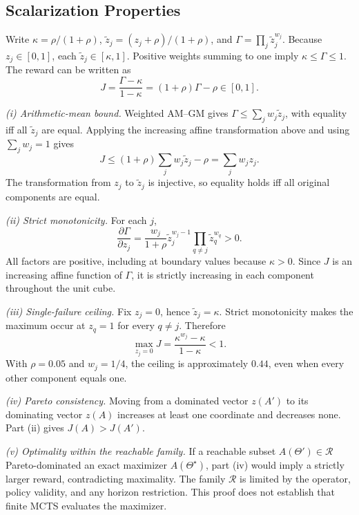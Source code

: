 \documentclass[conference]{IEEEtran}
\begin{document}
\subsection{Scalarization Properties}
\begin{IEEEproof}
Write $\kappa=\rho/(1+\rho)$, $\tilde z_j=(z_j+\rho)/(1+\rho)$, and $\Gamma=\prod_j\tilde z_j^{w_j}$. Because $z_j\in[0,1]$, each $\tilde z_j\in[\kappa,1]$. Positive weights summing to one imply $\kappa\le\Gamma\le1$. The reward can be written as
\[
J=\frac{\Gamma-\kappa}{1-\kappa}=(1+\rho)\Gamma-\rho\in[0,1].
\]

\textit{(i) Arithmetic-mean bound.} Weighted AM--GM gives $\Gamma\le\sum_jw_j\tilde z_j$, with equality iff all $\tilde z_j$ are equal. Applying the increasing affine transformation above and using $\sum_jw_j=1$ gives
\[
J\le(1+\rho)\sum_jw_j\tilde z_j-\rho=\sum_jw_jz_j.
\]
The transformation from $z_j$ to $\tilde z_j$ is injective, so equality holds iff all original components are equal.

\textit{(ii) Strict monotonicity.} For each $j$,
\[
\frac{\partial\Gamma}{\partial z_j}
=\frac{w_j}{1+\rho}\tilde z_j^{w_j-1}
\prod_{q\ne j}\tilde z_q^{w_q}>0.
\]
All factors are positive, including at boundary values because $\kappa>0$. Since $J$ is an increasing affine function of $\Gamma$, it is strictly increasing in each component throughout the unit cube.

\textit{(iii) Single-failure ceiling.} Fix $z_j=0$, hence $\tilde z_j=\kappa$. Strict monotonicity makes the maximum occur at $z_q=1$ for every $q\ne j$. Therefore
\[
\max_{z_j=0}J=\frac{\kappa^{w_j}-\kappa}{1-\kappa}<1.
\]
With $\rho=0.05$ and $w_j=1/4$, the ceiling is approximately $0.44$, even when every other component equals one.

\textit{(iv) Pareto consistency.} Moving from a dominated vector $z(A')$ to its dominating vector $z(A)$ increases at least one coordinate and decreases none. Part (ii) gives $J(A)>J(A')$.

\textit{(v) Optimality within the reachable family.} If a reachable subset $A(\Theta')\in\mathcal R$ Pareto-dominated an exact maximizer $A(\Theta^\star)$, part (iv) would imply a strictly larger reward, contradicting maximality. The family $\mathcal R$ is limited by the operator, policy validity, and any horizon restriction. This proof does not establish that finite MCTS evaluates the maximizer.
\end{IEEEproof}
\end{document}
